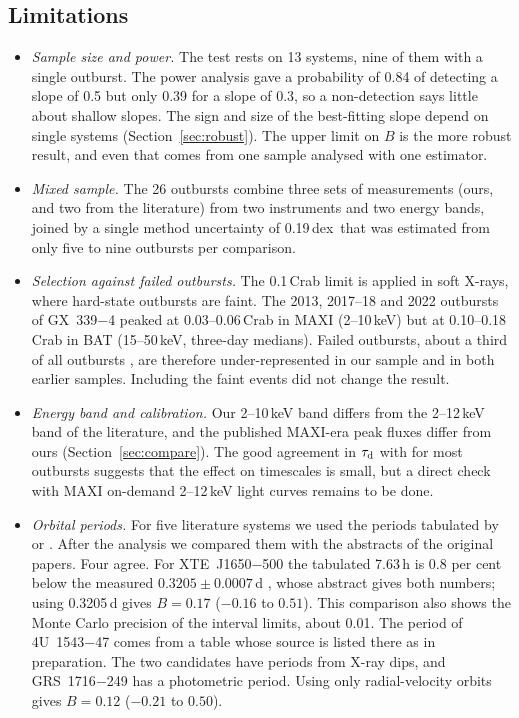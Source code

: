 \documentclass[fleqn,usenatbib]{mnras}
\newcommand{\taud}{\tau_{\rm d}}
\newcommand{\dex}{\,dex}
\begin{document}
\subsection{Limitations}
\label{sec:limits}

\begin{itemize}
\item \textit{Sample size and power.} The test rests on 13 systems, nine of them with a single outburst. The power analysis gave a probability of 0.84 of detecting a slope of 0.5 but only 0.39 for a slope of 0.3, so a non-detection says little about shallow slopes. The sign and size of the best-fitting slope depend on single systems (Section~\ref{sec:robust}). The upper limit on $B$ is the more robust result, and even that comes from one sample analysed with one estimator.
\item \textit{Mixed sample.} The 26 outbursts combine three sets of measurements (ours, and two from the literature) from two instruments and two energy bands, joined by a single method uncertainty of 0.19\dex\ that was estimated from only five to nine outbursts per comparison.
\item \textit{Selection against failed outbursts.} The 0.1\,Crab limit is applied in soft X-rays, where hard-state outbursts are faint. The 2013, 2017--18 and 2022 outbursts of GX~339$-$4 peaked at 0.03--0.06\,Crab in MAXI (2--10\,keV) but at 0.10--0.18\,Crab in BAT (15--50\,keV, three-day medians). Failed outbursts, about a third of all outbursts \citep{Alabarta2021}, are therefore under-represented in our sample and in both earlier samples. Including the faint events did not change the result.
\item \textit{Energy band and calibration.} Our 2--10\,keV band differs from the 2--12\,keV band of the literature, and the published MAXI-era peak fluxes differ from ours (Section~\ref{sec:compare}). The good agreement in $\taud$ with \citet{Saraswati2025} for most outbursts suggests that the effect on timescales is small, but a direct check with MAXI on-demand 2--12\,keV light curves remains to be done.
\item \textit{Orbital periods.} For five literature systems we used the periods tabulated by \citet{YanYu2015} or \citet{Saraswati2025}. After the analysis we compared them with the abstracts of the original papers. Four agree. For XTE~J1650$-$500 the tabulated 7.63\,h is 0.8 per cent below the measured $0.3205\pm0.0007$\,d \citep{Orosz2004}, whose abstract gives both numbers; using 0.3205\,d gives $B=0.17$ ($-0.16$ to $0.51$). This comparison also shows the Monte Carlo precision of the interval limits, about 0.01. The period of 4U~1543$-$47 comes from a table \citep{Orosz2003} whose source is listed there as in preparation. The two candidates have periods from X-ray dips, and GRS~1716$-$249 has a photometric period. Using only radial-velocity orbits gives $B=0.12$ ($-0.21$ to $0.50$).

\end{itemize}
\end{document}
